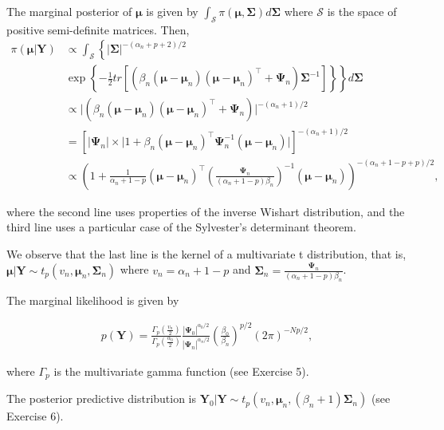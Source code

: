 \begin{enumerate}
The marginal posterior of $\mathbf{\mu}$ is given by $\int_{\mathcal{S}} \pi(\mathbf{\mu},\mathbf{\Sigma})d\mathbf{\Sigma}$ where $\mathcal{S}$ is the space of positive semi-definite matrices. Then,
{\footnotesize{
\begin{align}
	\pi(\mathbf{\mu}|\mathbf{Y})&\propto\int_{\mathcal{S}}\left\{|\mathbf{\Sigma}|^{-(\alpha_n+p+2)/2}\right.\nonumber\\
	&\left. \exp\left\{-\frac{1}{2}tr\left[\left(\beta_n\left(\mathbf{\mu}-\mathbf{\mu}_n\right)\left(\mathbf{\mu}-\mathbf{\mu}_n\right)^{\top}+\mathbf{\Psi}_n\right)\mathbf{\Sigma}^{-1}\right]\right\} \right\}d\mathbf{\Sigma}\nonumber\\
	&\propto \big\lvert\left(\beta_n\left(\mathbf{\mu}-\mathbf{\mu}_n\right)\left(\mathbf{\mu}-\mathbf{\mu}_n\right)^{\top}+\mathbf{\Psi}_n\right)\big\lvert^{-(\alpha_n+1)/2}\nonumber\\
	&=\left[\big\lvert\mathbf{\Psi}_n\big\lvert\times \big\lvert1+\beta_n\left(\mathbf{\mu}-\mathbf{\mu}_n\right)^{\top}\mathbf{\Psi}_n^{-1}\left(\mathbf{\mu}-\mathbf{\mu}_n\right)\big\lvert\right]^{-(\alpha_n+1)/2}\nonumber\\
	&\propto \left(1+\frac{1}{\alpha_n+1-p}\left(\mathbf{\mu}-\mathbf{\mu}_n\right)^{\top}\left(\frac{\mathbf{\Psi}_n}{(\alpha_n+1-p)\beta_n}\right)^{-1}\left(\mathbf{\mu}-\mathbf{\mu}_n\right)\right)^{-(\alpha_n+1-p+p)/2},\nonumber 
\end{align}
}}

where the second line uses properties of the inverse Wishart distribution, and the third line uses a particular case of the Sylvester's determinant theorem.

We observe that the last line is the kernel of a multivariate t distribution, that is, $\mathbf{\mu}|\mathbf{Y}\sim t_p(v_n,\mathbf{\mu}_n,\mathbf{\Sigma}_n)$ where $v_n=\alpha_n+1-p$ and $\mathbf{\Sigma}_n=\frac{\mathbf{\Psi}_n}{(\alpha_n+1-p)\beta_n}$.

The marginal likelihood is given by

\begin{align}
	p(\mathbf{Y})=\frac{\Gamma_p\left(\frac{v_n}{2}\right)}{\Gamma_p\left(\frac{\alpha_0}{2}\right)}\frac{|\mathbf{\Psi}_0|^{\alpha_0/2}}{|\mathbf{\Psi}_n|^{\alpha_n/2}}\left(\frac{\beta_0}{\beta_n}\right)^{p/2}(2\pi)^{-Np/2},\nonumber
\end{align}

where $\Gamma_p$ is the multivariate gamma function (see Exercise 5).

The posterior predictive distribution is $\mathbf{Y}_0|\mathbf{Y}\sim t_p(v_n,\mathbf{\mu}_n,(\beta_n+1)\mathbf{\Sigma}_n)$ (see Exercise 6).


\end{enumerate}
